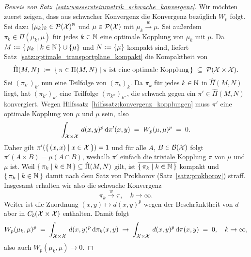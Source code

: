 \documentclass[../thesis/thesis.tex]{subfiles}
\begin{document}
\begin{proof}[Beweis von Satz~\ref{satz:wassersteinmetrik_schwache_konvergenz}]
		Wir möchten zuerst zeigen, dass aus schwacher Konvergenz die Konvergenz bezüglich $W_p$ folgt. Sei dazu $(\mu_k)_k \in \mathcal{P}(\mathcal{X})^{\mathbb{N}}$ und $\mu \in \mathcal{P}(\mathcal{X})$ mit $\mu_k \xrightarrow{w} \mu$. Sei außerdem $\pi_k \in \Pi(\mu_k, \mu)$ 
		für jedes $k \in \mathbb{N}$ eine optimale Kopplung von $\mu_k$ mit $\mu$. 
		Da $M \vcentcolon = \left\{\, \mu_k \; \middle| \; k \in \mathbb{N} \,\right\} \cup \left\{\mu\right\}$ und $N \vcentcolon = \left\{\mu\right\}$ kompakt sind, liefert Satz~\ref{satz:optimale_transportpläne_kompakt} die Kompaktheit von
		\[ \hat{\Pi}(M, N) \; \vcentcolon = \; \left\{\, \pi \in \Pi(M, N) \; \middle| \; \pi \; \text{ist eine optimale Kopplung} \,\right\} \; \subseteq \; \mathcal{P}(\mathcal{X} \times \mathcal{X}) \text{.} \]
		Sei $(\pi_{k'})_{k'}$ nun eine Teilfolge von $(\pi_k)_k$. Da $\pi_k$ für jedes $k \in \mathbb{N}$ in $\hat{\Pi}(M, N)$ liegt, hat $(\pi_{k'})_{k'}$ eine Teilfolge $(\pi_{k''})_{k''}$, 
		die schwach gegen ein $\pi' \in \hat{\Pi}(M, N)$ konvergiert. Wegen Hilfssatz~\ref{hilfssatz:konvergenz_kopplungen} muss $\pi'$ eine optimale Kopplung von $\mu$ und $\mu$ sein, also
		\[ \int_{\mathcal{X} \times \mathcal{X}} \, d(x, y)^p \, \mathrm{d}\pi'(x, y) \; = \; W_p(\mu, \mu)^p \; = \; 0 \text{.} \]
		Daher gilt $\pi'(\left\{\, (x, x) \; \middle| \; x \in \mathcal{X} \,\right\}) = 1$ und für alle $A$, $B \in \mathcal{B}(\mathcal{X})$ folgt $\pi'(A \times B) = \mu(A \cap B)$, weshalb $\pi'$ einfach die 
		triviale Kopplung $\pi$ von $\mu$ und $\mu$ ist. Weil $\left\{\, \pi_k \; \middle| \; k \in \mathbb{N} \,\right\} \subseteq \hat{\Pi}(M, N)$ gilt, ist $\overline{\left\{\, \pi_k \; \middle| \; k \in \mathbb{N} \,\right\}}$ kompakt und $\left\{\, \pi_k \; \middle| \; k \in \mathbb{N} \,\right\}$ damit nach
		dem Satz von Prokhorov (Satz~\ref{satz:prokhorov}) straff. Insgesamt erhalten wir also die schwache Konvergenz
		\[ \pi_k \xrightarrow{w} \pi, \quad k \to \infty \text{.} \] 
		Weiter ist die Zuordnung $(x, y) \mapsto d(x, y)^p$ wegen der Beschränktheit von $d$ aber in $C_b(\mathcal{X} \times \mathcal{X})$ enthalten. Damit folgt 
		\[ W_p(\mu_k, \mu)^p \; = \; \int_{\mathcal{X} \times \mathcal{X}} \, d(x, y)^p \, \mathrm{d}\pi_k(x, y) \; \to \; \int_{\mathcal{X} \times \mathcal{X}} \, d(x, y)^p \, \mathrm{d}\pi(x, y) \; = \; 0, \quad k \to \infty \text{,} \]
		also auch $W_p(\mu_k, \mu) \to 0$.
		

\end{proof}
\end{document}
